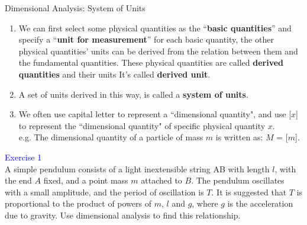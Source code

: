 \documentclass{beamer}
\begin{document}
\begin{frame}{Dimensional Analysis: System of Units}
\begin{enumerate}
  \item We can first select some physical quantities as the ``\textbf{basic quantities}”
  and specify a ``\textbf{unit for measurement}” for each basic quantity,
  the other physical quantities' units can be derived from the
  relation between them and the fundamental
  quantities. These physical quantities are called \textbf{derived quantities}
  and their units It's called \textbf{derived unit}.
  \item A set of units derived in this way, is called a \textbf{system of units}.
  \item We often use capital letter to represent a ``dimensional quantity", and
  use [$x$] to represent the ``dimensional quantity" of specific physical quantity $x$.\\
  e.g. The dimensional quantity of a particle of mass $m$ is written as: $M$ = [$m$].
\end{enumerate}
\end{frame}

\begin{frame}
  \textcolor{blue}{Exercise 1}\\
  A simple pendulum consists of a light inextensible string AB with length $l$, with the end $A$ fixed, and a point mass $m$ attached to $B$. The pendulum oscillates with a small amplitude, and the period of oscillation is $T$. It is suggested that $T$ is proportional to the product of powers of $m$, $l$ and $g$, where $g$ is the acceleration due to gravity. Use dimensional analysis to find this relationship. 
\end{frame}
\end{document}
